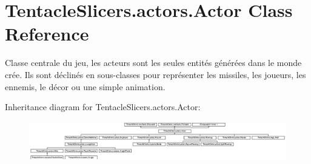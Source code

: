 \hypertarget{class_tentacle_slicers_1_1actors_1_1_actor}{}\section{Tentacle\+Slicers.\+actors.\+Actor Class Reference}
\label{class_tentacle_slicers_1_1actors_1_1_actor}


Classe centrale du jeu, les acteurs sont les seules entités générées dans le monde crée. Ils sont déclinés en sous-\/classes pour représenter les missiles, les joueurs, les ennemis, le décor ou une simple animation.  


Inheritance diagram for Tentacle\+Slicers.\+actors.\+Actor\+:\begin{figure}[H]
\begin{center}
\leavevmode
\includegraphics[height=1.721312cm]{class_tentacle_slicers_1_1actors_1_1_actor}
\end{center}
\end{figure}
